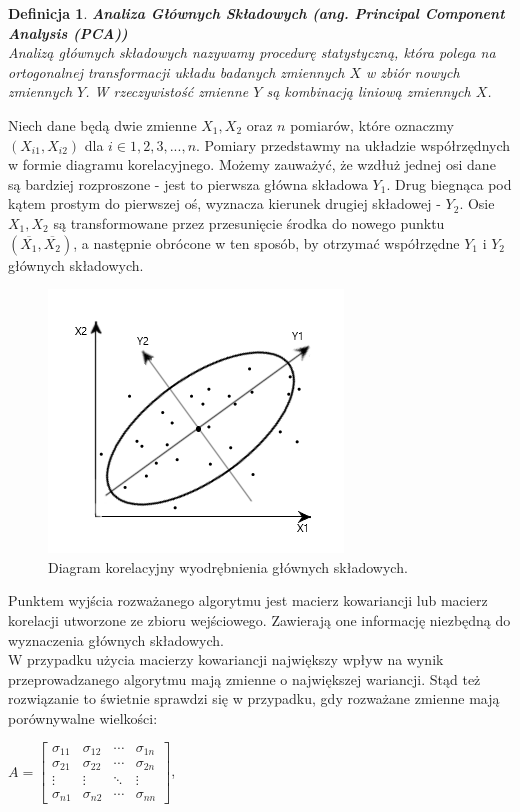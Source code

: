 \documentclass[12pt,a4paper]{report}
\newtheorem{df}{Definicja}
\begin{document}
\begin{df}\textbf{Analiza Głównych Składowych (ang. Principal Component Analysis (PCA))}
\\Analizą głównych składowych nazywamy procedurę statystyczną, która polega na ortogonalnej transformacji układu badanych zmiennych $X$ w zbiór nowych zmiennych $Y$. W rzeczywistość zmienne $Y$ są kombinacją liniową zmiennych $X$.
\end{df}
Niech dane będą dwie zmienne $X_1, X_2$ oraz $n$ pomiarów, które oznaczmy $(X_{i1},X_{i2})$ dla $i \in {1,2,3,...,n}$. Pomiary przedstawmy na układzie współrzędnych w formie diagramu korelacyjnego. Możemy zauważyć, że wzdłuż jednej osi dane są bardziej rozproszone - jest to pierwsza główna składowa $Y_1$. Drug biegnąca pod kątem prostym do pierwszej oś, wyznacza kierunek drugiej składowej - $Y_2$. Osie $X_1, X_2$ są transformowane przez przesunięcie środka do nowego punktu $(\overline{X_1},\overline{X_2})$, a następnie obrócone w ten sposób, by otrzymać współrzędne $Y_1$ i $Y_2$ głównych składowych.
\begin{figure}[H]
\centering
\includegraphics[scale=1]{obrazek.PNG} 
\caption{Diagram korelacyjny wyodrębnienia głównych składowych.}
\end{figure}
\bigskip
Punktem wyjścia rozważanego algorytmu jest macierz kowariancji lub macierz korelacji utworzone ze zbioru wejściowego. Zawierają one informację niezbędną do wyznaczenia głównych składowych.
\\W przypadku użycia macierzy kowariancji największy wpływ na wynik przeprowadzanego algorytmu mają zmienne o największej wariancji. Stąd też rozwiązanie to świetnie sprawdzi się w przypadku, gdy rozważane zmienne mają porównywalne wielkości: 
\begin{center}
$ A= \left[
        \begin{array}{cccc}
         \sigma_{11} & \sigma_{12} & \cdots & \sigma_{1n}\\
         \sigma_{21} & \sigma_{22} & \cdots & \sigma_{2n}\\
         \vdots & \vdots & \ddots & \vdots\\
         \sigma_{n1} & \sigma_{n2} & \cdots & \sigma_{nn}
         \end{array}
      \right]$, 
\end{center}
\end{document}
